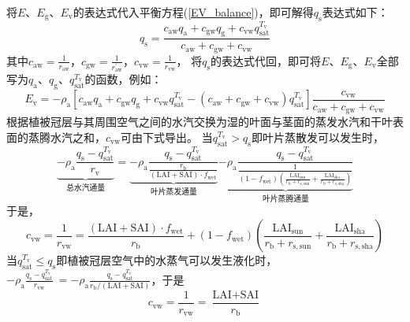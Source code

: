 将$E$、$E_{\mathrm{g}}$、$E_{\mathrm{v}}$的表达式代入平衡方程(\ref{EV_balance})，即可解得$q_{\mathrm {s}}$表达式如下：
\begin{equation}\label{Eg_2}
  q_{\mathrm{s}}=\frac{c_{\mathrm{aw}} q_{\mathrm{a}}+c_{\mathrm{gw}} q_{\mathrm{g}}+c_{\mathrm{vw}} q_{\mathrm{s a t}}^{T_{\mathrm{v}}}}{c_{\mathrm{aw}}+c_{\mathrm{gw}}+c_{\mathrm{vw}}}
\end{equation}
其中$c_{\mathrm{aw}}=\frac{1}{r_{\mathrm{aw}}}$，$c_{\mathrm{gw}}=\frac{1}{r_{\mathrm{aw}}^\prime}$，$c_{\mathrm{vw}}=\frac{1}{r_{\mathrm{vw}}}$，
将$q_{\mathrm {s}}$的表达式代回，即可将$E$、$E_{\mathrm{g}}$、$E_{\mathrm{v}}$全部写为$q_{\mathrm{a}}$、$q_{\mathrm {g}}$、$q_{\mathrm{sat}}^{T_{\mathrm v}}$的函数，例如：
\begin{equation}\label{Ev}
  E_{\mathrm{v}}=-\rho_{\mathrm{a}}\left[c_{\mathrm{aw}} q_{\mathrm{a}}+c_{\mathrm{gw}} q_{\mathrm{g}}+c_{\mathrm{vw}} q_{\mathrm{s a t}}^{T_{\mathrm{v}}}-
  \left(c_{\mathrm{aw}}+c_{\mathrm{gw}}+c_{\mathrm{vw}}\right) q_{\mathrm{s a t}}^{T_{\mathrm{v}}}\right] \frac{c_{\mathrm{vw}}}{c_{\mathrm{aw}}+c_{\mathrm{gw}}+c_{\mathrm{vw}}}
\end{equation}
根据植被冠层与其周围空气之间的水汽交换为湿的叶面与茎面的蒸发水汽和干叶表面的蒸腾水汽之和，$c_{\mathrm{vw}}$可由下式导出。
当$q_{\mathrm{sat}}^{T_{\mathrm v}}>q_{\mathrm {s}}$即叶片蒸散发可以发生时，%
\begin{equation}
  \underbrace{-\rho_{\mathrm{a}} \frac{q_{\mathrm{s}}-q_{\mathrm{s a t}}^{T_{\mathrm{v}}}}{r_{\mathrm{{v }}}}}_{\text{总水汽通量}}
  =\underbrace{-\rho_{\mathrm{a}}
  \frac{q_{\mathrm{s}}-q_{\mathrm{s a t}}^{T_{\mathrm{v}}}}{\frac{r_{\mathrm{b}}}{(\text {LAI}+\text {SAI}) \cdot f_{\mathrm{{wet }}}}}}_{\text{叶片蒸发通量}}
  \underbrace{-\rho_{\mathrm{a}} \frac{q_{\mathrm{s}}-q_{\mathrm{s a t}}^{T_{\mathrm{v}}}}{\frac{1}{\left(1-f_{\mathrm{wet}}\right)\left(\frac{{\text {LAI}}_{\mathrm{sun}}}{r_{\mathrm{b}}+r_{\mathrm{s,sun}}} + \frac{{\text {LAI}}_{\mathrm{sha}}}{r_{\mathrm{b}}+r_{\mathrm{s,sha}}}\right)}}}_{\text{叶片蒸腾通量}}
\end{equation}
于是，
\begin{equation}
  c_{\mathrm{vw}}=\frac{1}{r_{\mathrm{vw}}}=\frac{(\text {LAI}+\text {SAI}) \cdot f_{\mathrm{{wet }}}}{r_{\mathrm{b}}}+\left(1-f_{\mathrm{wet}}\right)\left(\frac{\text {LAI}_{\mathrm{sun}}}{r_{\mathrm{b}}+r_{\mathrm{s,sun}}} + \frac{\text {LAI}_{\mathrm{sha}}}{r_{\mathrm{b}}+r_{\mathrm{s,sha}}}\right)
\end{equation}
当$q_{\mathrm{sat}}^{T_{\mathrm v}}\leqslant q_{\mathrm {s}}$即植被冠层空气中的水蒸气可以发生液化时，
$-\rho_{\mathrm{a}}\frac{q_{\mathrm {s}}-q_{\mathrm{sat}}^{T_{\mathrm v}}}{r_{\mathrm{vw}}}\ =-\rho_{\mathrm{a}} \frac{q_{\mathrm {s}}-q_{\mathrm{sat}}^{T_{\mathrm v}}}{r_{\mathrm {b}}/\left(\text {LAI}+\text {SAI}\right)}$，于是
\begin{equation}
  c_{\mathrm{vw}}=\frac{1}{r_{\mathrm{{vw }}}}=\frac{\text {LAI}+\text {SAI}}{r_{\mathrm{b}}}
\end{equation}

